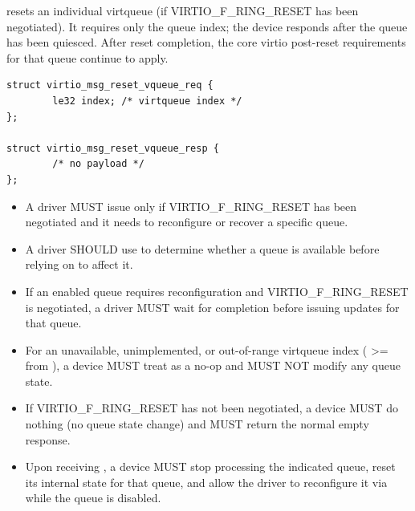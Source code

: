  resets an individual virtqueue (if VIRTIO\_F\_RING\_RESET
has been negotiated). It requires only the queue index; the device responds
after the queue has been quiesced. After reset completion, the core virtio
post-reset requirements for that queue continue to apply.

\begin{lstlisting}
struct virtio_msg_reset_vqueue_req {
        le32 index; /* virtqueue index */
};

struct virtio_msg_reset_vqueue_resp {
        /* no payload */
};
\end{lstlisting}

\begin{itemize}
  \item A driver MUST issue  only if
        VIRTIO\_F\_RING\_RESET has been negotiated and it needs to reconfigure
        or recover a specific queue.
  \item A driver SHOULD use  to determine whether a queue is
        available before relying on  to affect it.
  \item If an enabled queue requires reconfiguration and
        VIRTIO\_F\_RING\_RESET is negotiated, a driver MUST wait for
         completion before issuing 
        updates for that queue.
\end{itemize}

\begin{itemize}
  \item For an unavailable, unimplemented, or out-of-range virtqueue index
        ( >=  from ),
        a device MUST treat  as a no-op and MUST NOT
        modify any queue state.
  \item If VIRTIO\_F\_RING\_RESET has not been negotiated, a device MUST do
        nothing (no queue state change) and MUST return the normal empty
         response.
  \item Upon receiving , a device MUST stop processing the
        indicated queue, reset its internal state for that queue, and allow the
        driver to reconfigure it via  while the queue is
        disabled.
\end{itemize}

